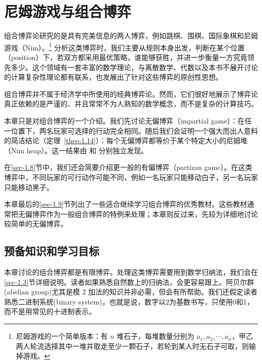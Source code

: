 \chapter{尼姆游戏与组合博弈}\label{c1}

\makeatletter


\renewcommand{\theequation}{\thechapter.\arabic{equation}}

\makeatother




组合博弈论研究的是具有完美信息的两人博弈，例如跳棋、围棋、国际象棋和尼姆游戏（Nim）。\footnote{尼姆游戏的一个简单版本：有 $n$ 堆石子，每堆数量分别为 $a_1, a_2, \cdots, a_n$，甲乙两人轮流选择其中一堆并取走至少一颗石子，若轮到某人时无石子可取，则输掉游戏。} 分析这类博弈时，我们主要从规则本身出发，判断在某个位置（position）下，若双方都采用最优策略，谁能够获胜，并进一步衡量一方究竟领先多少。这个领域有一套丰富的数学理论，与离散数学、代数以及本书不展开讨论的计算复杂性理论都有联系，也发展出了针对这些博弈的原创性思想。

组合博弈并不属于经济学中所使用的经典博弈论。然而，它们很好地展示了博弈论真正依赖的是严谨的、并且常常不为人熟知的数学概念，而不是复杂的计算技巧。

本章只是对组合博弈的一个介绍。我们先讨论无偏博弈（impartial game）：在任一位置下，两名玩家可选择的行动完全相同。随后我们会证明一个强大而出人意料的简洁结论（定理~\ref{theo:1.14}）：每个无偏博弈都等价于某个特定大小的尼姆堆（Nim heap）。这一结果由 \citet{sprague1935} 和 \citet{grundy1939} 分别独立发现。

在\ref{sec-1.8}节中，我们还会简要介绍更一般的有偏博弈（partizan game）。在这类博弈中，不同玩家的可行动作可能不同，例如一名玩家只能移动白子，另一名玩家只能移动黑子。

本章最后的\ref{sec-1.9}节列出了一些适合继续学习组合博弈的优秀教材。这些教材通常把无偏博弈作为一般组合博弈的特例来处理；本章则反过来，先较为详细地讨论较简单的无偏博弈。

\section{预备知识和学习目标}

本章讨论的组合博弈都是有限博弈。处理这类博弈需要用到数学归纳法，我们会在\ref{sec-1.3}节详细说明。读者如果熟悉自然数上的归纳法，会更容易跟上。阿贝尔群(abelian group)尤其是模 2 加法的知识并非必需，但会有所帮助。我们还假定读者熟悉二进制系统(binary system)，也就是说，数字以2为基数书写，只使用0和1，而不是用常见的十进制表示。

